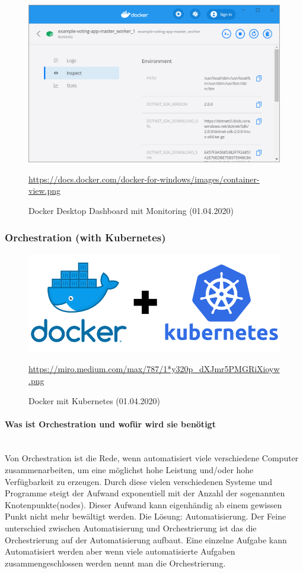 \begin{figure}[H]
    \includegraphics[scale=.70]{images/docker-desktop-view2.png}
    \caption{Docker Desktop Dashboard mit Monitoring (01.04.2020)}
    \url{https://docs.docker.com/docker-for-windows/images/container-view.png}
    \label{img:docker-desktop-view2}
\end{figure}
\subsubsection{Orchestration (with Kubernetes)}\label{ssec:DockerOrchestration}
\begin{figure}[H]
    \includegraphics[scale=.50]{images/kubernetesLogo.png}
    \caption{Docker mit Kubernetes (01.04.2020)}
    \url{https://miro.medium.com/max/787/1*y320p_dXJmr5PMGRiXioyw.png}
\end{figure}
\paragraph{Was ist Orchestration und wofür wird sie benötigt}\mbox{}\\
Von Orchestration ist die Rede, wenn automatisiert viele verschiedene Computer zusammenarbeiten, um eine möglichst hohe Leistung und/oder hohe Verfügbarkeit zu erzeugen. Durch diese vielen verschiedenen Systeme und Programme steigt der Aufwand exponentiell mit der Anzahl der sogenannten Knotenpunkte(nodes). Dieser Aufwand kann eigenhändig ab einem gewissen Punkt nicht mehr bewältigt werden. Die Lösung: Automatisierung. Der Feine unterschied zwischen Automatisierung und Orchestrierung ist das die Orchestrierung auf der Automatisierung aufbaut. Eine einzelne Aufgabe kann Automatisiert werden aber wenn viele automatisierte Aufgaben zusammengeschlossen werden nennt man die Orchestrierung. 

